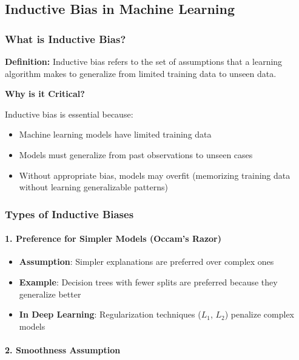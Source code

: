 \subsection{Inductive Bias in Machine Learning}

\subsubsection{What is Inductive Bias?}

\textbf{Definition:} Inductive bias refers to the set of assumptions that a learning algorithm makes to generalize from limited training data to unseen data.

\textbf{Why is it Critical?}

Inductive bias is essential because:

\begin{itemize}
\item Machine learning models have limited training data
\item Models must generalize from past observations to unseen cases  
\item Without appropriate bias, models may overfit (memorizing training data without learning generalizable patterns)
\end{itemize}

\subsubsection{Types of Inductive Biases}

\paragraph{1. Preference for Simpler Models (Occam's Razor)}

\begin{itemize}
\item \textbf{Assumption}: Simpler explanations are preferred over complex ones
\item \textbf{Example}: Decision trees with fewer splits are preferred because they generalize better
\item \textbf{In Deep Learning}: Regularization techniques ($L_1$, $L_2$) penalize complex models
\end{itemize}

\paragraph{2. Smoothness Assumption}

